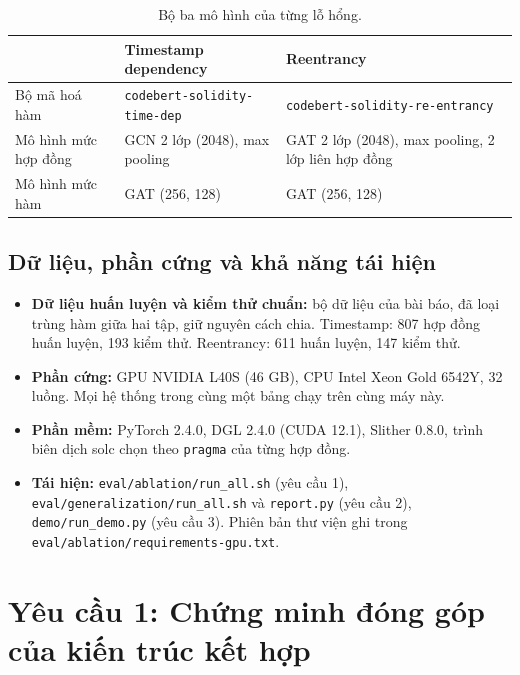 \documentclass[12pt,a4paper]{article}
\newcommand{\code}[1]{\texttt{#1}}
\begin{document}
\begin{table}[H]\centering\small
\caption{Bộ ba mô hình của từng lỗ hổng.}\label{tab:models}
\begin{tabularx}{\textwidth}{lYY}
\toprule
 & Timestamp dependency & Reentrancy\\
\midrule
Bộ mã hoá hàm & \code{codebert-solidity-time-dep} & \code{codebert-solidity-re-entrancy}\\
Mô hình mức hợp đồng & GCN 2 lớp (2048), max pooling & GAT 2 lớp (2048), max pooling, 2 lớp liên hợp đồng\\
Mô hình mức hàm & GAT (256, 128) & GAT (256, 128)\\
\bottomrule
\end{tabularx}
\end{table}

\subsection{Dữ liệu, phần cứng và khả năng tái hiện}
\begin{itemize}
\item \textbf{Dữ liệu huấn luyện và kiểm thử chuẩn:} bộ dữ liệu của bài báo, đã loại trùng hàm giữa hai tập, giữ nguyên cách chia. Timestamp: 807 hợp đồng huấn luyện, 193 kiểm thử. Reentrancy: 611 huấn luyện, 147 kiểm thử.
\item \textbf{Phần cứng:} GPU NVIDIA L40S (46 GB), CPU Intel Xeon Gold 6542Y, 32 luồng. Mọi hệ thống trong cùng một bảng chạy trên cùng máy này.
\item \textbf{Phần mềm:} PyTorch 2.4.0, DGL 2.4.0 (CUDA 12.1), Slither 0.8.0, trình biên dịch solc chọn theo \code{pragma} của từng hợp đồng.
\item \textbf{Tái hiện:} \code{eval/ablation/run\_all.sh} (yêu cầu 1), \code{eval/generalization/run\_all.sh} và \code{report.py} (yêu cầu 2), \code{demo/run\_demo.py} (yêu cầu 3). Phiên bản thư viện ghi trong \code{eval/ablation/requirements-gpu.txt}.
\end{itemize}

\section{Yêu cầu 1: Chứng minh đóng góp của kiến trúc kết hợp}
\end{document}
